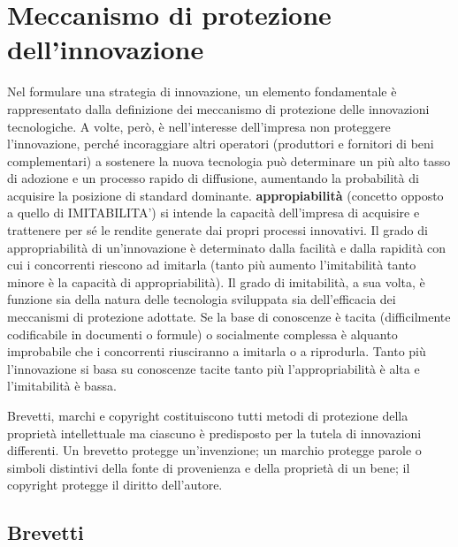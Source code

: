 \documentclass{article}
\begin{document}
\section{Meccanismo di protezione dell'innovazione}
Nel formulare una strategia di innovazione, un elemento fondamentale è rappresentato dalla
definizione dei meccanismo di protezione delle innovazioni tecnologiche.
A volte, però, è nell’interesse dell’impresa non proteggere l’innovazione, perché incoraggiare altri
operatori (produttori e fornitori di beni complementari) a sostenere la nuova tecnologia può
determinare un più alto tasso di adozione e un processo rapido di diffusione, aumentando la
probabilità di acquisire la posizione di standard dominante.
\textbf{appropiabilità} (concetto opposto a quello di IMITABILITA’)  si intende la capacità
dell’impresa di acquisire e trattenere per sé le rendite generate dai propri processi innovativi. Il
grado di appropriabilità di un’innovazione è determinato dalla facilità e dalla rapidità con cui i
concorrenti riescono ad imitarla (tanto più aumento l’imitabilità tanto minore è la capacità di
appropriabilità). Il grado di imitabilità, a sua volta, è funzione sia della natura delle tecnologia
sviluppata sia dell’efficacia dei meccanismi di protezione adottate.
Se la base di conoscenze è tacita (difficilmente codificabile in documenti o formule) o socialmente
complessa è alquanto improbabile che i concorrenti riusciranno a imitarla o a riprodurla.
Tanto più l’innovazione si basa su conoscenze tacite tanto più l’appropriabilità è alta e l’imitabilità
è bassa.

Brevetti, marchi e copyright costituiscono tutti metodi di protezione della proprietà intellettuale
ma ciascuno è predisposto per la tutela di innovazioni differenti.
Un brevetto protegge un’invenzione; un marchio protegge parole o simboli distintivi della fonte di
provenienza e della proprietà di un bene; il copyright protegge il diritto dell’autore.

\subsection{Brevetti}
\end{document}

